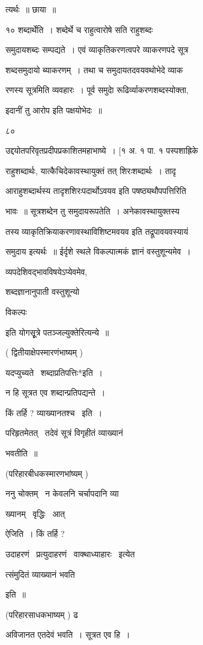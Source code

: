 \documentclass[11pt, openany]{book}
\begin{document}
त्यर्थः~॥ छाया~॥ 

१० शब्दार्थेति~। शब्देर्थे च राहुत्वारोषे सति राहुशब्दः 

समुदायशब्दः सम्पद्यते~। एवं व्याकृतिकरणत्वपरे व्याकरणपदे सूत्र \textendash\ 

शब्दसमुदायो ब्याकरणम्~। तथा च समुदायतदवयवथोभेदे व्याक 

रणस्य सूत्रमिति व्यवहारः~। पूर्व समुदाे रूढिर्व्याकरणशब्दस्योक्ता, 

इदानीं तु आरोप इति पक्षयोभेदः~॥ 

८० 

उद्दयोतपरिवृतप्रदीपप्रकाशितमहाभाष्ये~। [१ अ. १ पा. १ पस्पशाह्रिके 



राहुशब्दार्थः, यात्कैचिदेकावस्थायुक्तं तत् शिरःशब्दार्थः~। तादृ \textendash\ 

आराहुशब्दार्थस्य तादृशशिरःपदार्थोऽवयव इति पषष्ठ्यथौपपत्तिरिति 

भावः~॥ सूत्रशब्देन तु समुदायरूपतेति~। अनेकावस्थायुक्तस्य 

तस्य व्याकृतिक्रियाकरणावस्थाविशिष्टमवयव इति तद्रूपावयवस्यायं 

समुदाय इत्यर्थः~॥ ईर्दृशे स्थले विकल्पात्मकं ज्ञानं वस्तुशून्यमेव~। 

व्यपदेशिवद्भावविषयेऽप्येवमेव, {\qt शब्दज्ञानानुपाती वस्तुशून्यो 

विकल्पः} इति योगसूृत्रे पतञ्जल्युक्तेरित्यन्ये~॥ 

( द्वितीयाक्षेपस्मारणंभाष्यम् ) 

यदप्युच्यते \textendash\ {\qt *शब्दाप्रतिपत्तिः}*इति~। 

न हि सूत्रत एव शब्दान्प्रतिपद्यन्ते~। 

किं तर्हि ? व्याख्यानतश्च \textendash\ इति~। 

परिहृतमेतत् \textendash\ तदेवं सूत्रं विगृहीतं व्याख्यानं 

भवतीति~॥ 

(परिहारबीधकस्मारणभांष्यम् ) 

ननु चोक्तम् \textendash\ न केवलनि चर्चापदानि व्या \textendash\ 

ख्यानम् \textendash\ वृद्धिः \textendash\ आत्{\qt ऐजिति~। किं तर्हि ? 

उदाहरणं \textendash\ प्रत्युदाहरणं \textendash\ वाक्थाध्याहारः \textendash\ इत्येत \textendash\ 

त्संमुदितं व्याख्यानं भवति} इति~॥ 

(परिहारसाधकभाष्यम् ) ढ 

अविजानत एतदेवं भवति~। सूत्रत एव हि~। 
\end{document}
